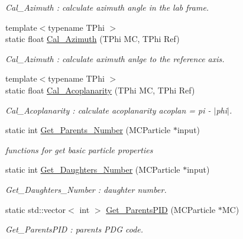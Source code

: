 \begin{DoxyCompactItemize}
\begin{DoxyCompactList}\small\item\em Cal\_\-Azimuth : calculate azimuth angle in the lab frame. \item\end{DoxyCompactList}\item 
{\footnotesize template$<$typename TPhi $>$ }\\static float \hyperlink{classToolSet_1_1CMC_ab77fa5dd46a12ac8887776724261f72b}{Cal\_\-Azimuth} (TPhi MC, TPhi Ref)
\begin{DoxyCompactList}\small\item\em Cal\_\-Azimuth : calculate aximuth anlge to the reference axis. \item\end{DoxyCompactList}\item 
{\footnotesize template$<$typename TPhi $>$ }\\static float \hyperlink{classToolSet_1_1CMC_aa1667ca515e4b26ca43755fd8d2e30bd}{Cal\_\-Acoplanarity} (TPhi MC, TPhi Ref)
\begin{DoxyCompactList}\small\item\em Cal\_\-Acoplanarity : calculate acoplanarity acoplan = pi -\/ $|$phi$|$. \item\end{DoxyCompactList}\item 
static int \hyperlink{classToolSet_1_1CMC_a67ab1d51b7fd0f98cfa19be5381e961a}{Get\_\-Parents\_\-Number} (MCParticle $\ast$input)
\begin{DoxyCompactList}\small\item\em functions for get basic particle properties \item\end{DoxyCompactList}\item 
static int \hyperlink{classToolSet_1_1CMC_a44a3b5e5df7effa4ed170151cd63b706}{Get\_\-Daughters\_\-Number} (MCParticle $\ast$input)
\begin{DoxyCompactList}\small\item\em Get\_\-Daughters\_\-Number : daughter number. \item\end{DoxyCompactList}\item 
static std::vector$<$ int $>$ \hyperlink{classToolSet_1_1CMC_aa98186321fc75d5f476bc97511e1d91b}{Get\_\-ParentsPID} (MCParticle $\ast$MC)
\begin{DoxyCompactList}\small\item\em Get\_\-ParentsPID : parents PDG code. \item\end{DoxyCompactList}\item 

\end{DoxyCompactItemize}
